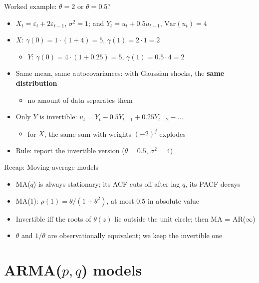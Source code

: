 \begin{frame}{Worked example: $\theta = 2$ or $\theta = 0.5$?}
\itemsize{\small}
\begin{itemize}
    \item $X_t = \varepsilon_t + 2\varepsilon_{t-1}$, $\sigma^2 = 1$; and $Y_t = u_t + 0.5u_{t-1}$, $\mathrm{Var}(u_t) = 4$
    \item $X$: $\gamma(0) = 1 \cdot (1 + 4) = 5$, $\gamma(1) = 2 \cdot 1 = 2$
    \begin{itemize}
        \item $Y$: $\gamma(0) = 4 \cdot (1 + 0.25) = 5$, $\gamma(1) = 0.5 \cdot 4 = 2$
    \end{itemize}
    \item Same mean, same autocovariances: with Gaussian shocks, the \textbf{same distribution}
    \begin{itemize}
        \item no amount of data separates them
    \end{itemize}
    \item Only $Y$ is invertible: $u_t = Y_t - 0.5Y_{t-1} + 0.25Y_{t-2} - \dots$
    \begin{itemize}
        \item for $X$, the same sum with weights $(-2)^j$ explodes
    \end{itemize}
    \item Rule: report the invertible version ($\theta = 0.5$, $\sigma^2 = 4$)
\end{itemize}
\end{frame}

\begin{frame}{Recap: Moving-average models}
\itemsize{\small}
\begin{itemize}
    \item MA($q$) is always stationary; its ACF cuts off after lag $q$, its PACF decays
    \item MA(1): $\rho(1) = \theta/(1 + \theta^2)$, at most $0.5$ in absolute value
    \item Invertible iff the roots of $\theta(z)$ lie outside the unit circle; then MA = AR($\infty$)
    \item $\theta$ and $1/\theta$ are observationally equivalent; we keep the invertible one
\end{itemize}
\end{frame}


\section{ARMA($p,q$) models}

